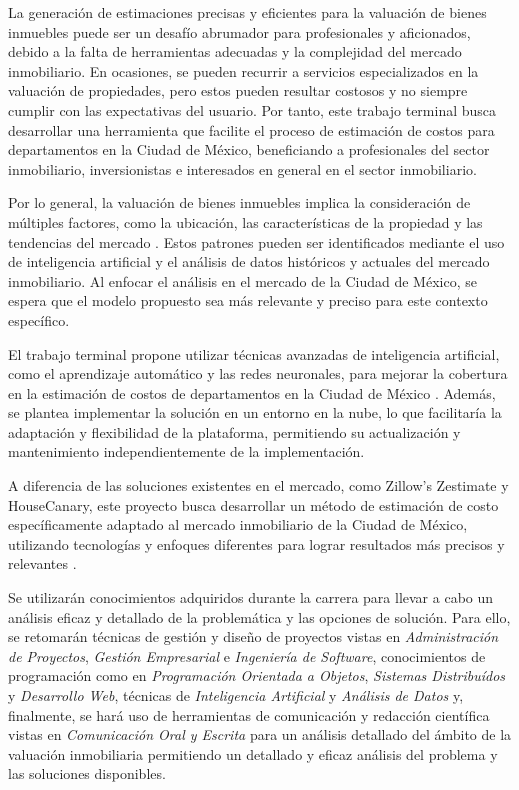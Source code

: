 La generación de estimaciones precisas y eficientes para la valuación de bienes
inmuebles puede ser un desafío abrumador para profesionales y aficionados, debido
a la falta de herramientas adecuadas y la complejidad del mercado inmobiliario.
En ocasiones, se pueden recurrir a servicios especializados en la valuación de
propiedades, pero estos pueden resultar costosos y no siempre cumplir con las
expectativas del usuario. Por tanto, este trabajo terminal busca desarrollar una
herramienta que facilite el proceso de estimación de costos para departamentos
en la Ciudad de México, beneficiando a profesionales del sector inmobiliario,
inversionistas e interesados en general en el sector inmobiliario.

Por lo general, la valuación de bienes inmuebles implica la consideración de
múltiples factores, como la ubicación, las características de la propiedad y
las tendencias del mercado \cite{limsombunchai2004}. Estos patrones pueden ser
identificados mediante el uso de inteligencia artificial y el análisis de datos
históricos y actuales del mercado inmobiliario. Al enfocar el análisis en el
mercado de la Ciudad de México, se espera que el modelo propuesto sea más
relevante y preciso para este contexto específico.

El trabajo terminal propone utilizar técnicas avanzadas de inteligencia artificial,
como el aprendizaje automático y las redes neuronales, para mejorar la cobertura
en la estimación de costos de departamentos en la Ciudad de México \cite{worzala1995}.
Además, se plantea implementar la solución en un entorno en la nube, lo que
facilitaría la adaptación y flexibilidad de la plataforma, permitiendo su
actualización y mantenimiento independientemente de la implementación.

A diferencia de las soluciones existentes en el mercado, como Zillow's Zestimate
y HouseCanary, este proyecto busca desarrollar un método de estimación de costo
específicamente adaptado al mercado inmobiliario de la Ciudad de México, utilizando
tecnologías y enfoques diferentes para lograr resultados más precisos y relevantes
\cite{housecanary2021,zillow2023}.

Se utilizarán conocimientos adquiridos durante la carrera para llevar a cabo un
análisis eficaz y detallado de la problemática y las opciones de solución. Para
ello, se retomarán técnicas de gestión y diseño de proyectos vistas en
\textit{Administración de Proyectos}, \textit{Gestión Empresarial} e
\textit{Ingeniería de Software}, conocimientos de programación como en
\textit{Programación Orientada a Objetos}, \textit{Sistemas Distribuídos} y
\textit{Desarrollo Web}, técnicas de \textit{Inteligencia Artificial} y
\textit{Análisis de Datos} y, finalmente, se hará uso de herramientas de
comunicación y redacción científica vistas en \textit{Comunicación Oral y Escrita}
para un análisis detallado del ámbito de la valuación inmobiliaria permitiendo un
detallado y eficaz análisis del problema y las soluciones disponibles.

